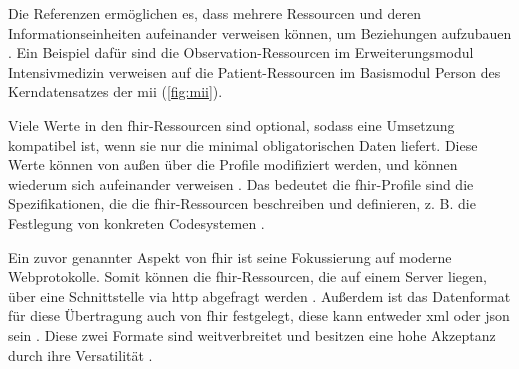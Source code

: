 Die Referenzen ermöglichen es, dass mehrere Ressourcen und deren Informationseinheiten aufeinander verweisen können, um Beziehungen aufzubauen \cite{fhir}. Ein Beispiel dafür sind die \glqq Observation\grqq{}-Ressourcen im Erweiterungsmodul \glqq Intensivmedizin\grqq{} verweisen auf die \glqq Patient\grqq{}-Ressourcen im Basismodul \glqq Person\grqq{} des Kerndatensatzes der \ac{mii} (\ref{fig:mii}).

Viele Werte in den \ac{fhir}-Ressourcen sind optional, sodass eine Umsetzung kompatibel ist, wenn sie nur die minimal obligatorischen Daten liefert. Diese Werte können von außen über die Profile modifiziert werden, und können wiederum sich aufeinander verweisen \cite{ehealtOk}. Das bedeutet die \ac{fhir}-Profile sind die Spezifikationen, die die \ac{fhir}-Ressourcen beschreiben und definieren, z. B. die Festlegung von konkreten Codesystemen \cite{fhir, fhircompact}.

Ein zuvor genannter Aspekt von \ac{fhir} ist seine Fokussierung auf moderne Webprotokolle. Somit können die \ac{fhir}-Ressourcen, die auf einem Server liegen, über eine Schnittstelle via \ac{http} abgefragt werden \cite{telemedizin, ehealtOk}. Außerdem ist das Datenformat für diese Übertragung auch von \ac{fhir} festgelegt, diese kann entweder \ac{xml} oder \ac{json} sein \cite{ehealtOk}. Diese zwei Formate sind weitverbreitet und besitzen eine hohe Akzeptanz durch ihre Versatilität \cite{fhirformat}.

